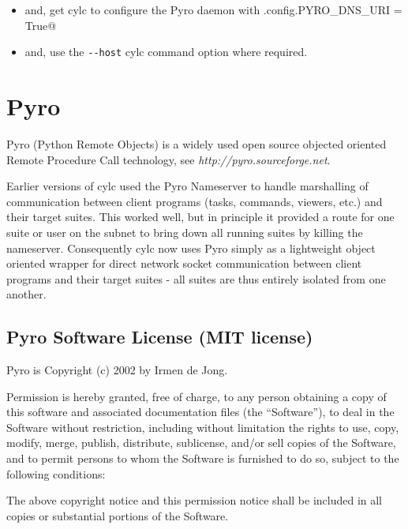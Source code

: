\documentclass[11pt,a4paper]{article}
\begin{document}
\begin{itemize}

    \item and, get cylc to configure the Pyro daemon 
        with \lstinline@Pyro.config.PYRO_DNS_URI = True@ 
        
    \item and, use the \lstinline=--host= cylc command option where
        required.

\end{itemize}

        
\section{Pyro} 
\label{Pyro}

Pyro (Python Remote Objects) is a widely used open source objected
oriented Remote Procedure Call technology, see {\em
http://pyro.sourceforge.net}.

Earlier versions of cylc used the Pyro Nameserver to handle marshalling
of communication between client programs (tasks, commands, viewers,
etc.) and their target suites. This worked well, but in principle it
provided a route for one suite or user on the subnet to bring down 
all running suites by killing the nameserver. Consequently cylc now
uses Pyro simply as a lightweight object oriented wrapper for
direct network socket communication between client programs and their
target suites - all suites are thus entirely isolated from
one another. 

\subsection{Pyro Software License (MIT license)}
\label{PyroSoftwareLicense(MITlicense)}

Pyro is Copyright (c) 2002  by Irmen de Jong.

Permission is hereby granted, free of charge, to any person obtaining a
copy of this software and associated documentation files (the
``Software''), to deal in the Software without restriction, including
without limitation the rights to use, copy, modify, merge, publish,
distribute, sublicense, and/or sell copies of the Software, and to
permit persons to whom the Software is furnished to do so, subject to
the following conditions:

The above copyright notice and this permission notice shall be included
in all copies or substantial portions of the Software.
\end{document}
